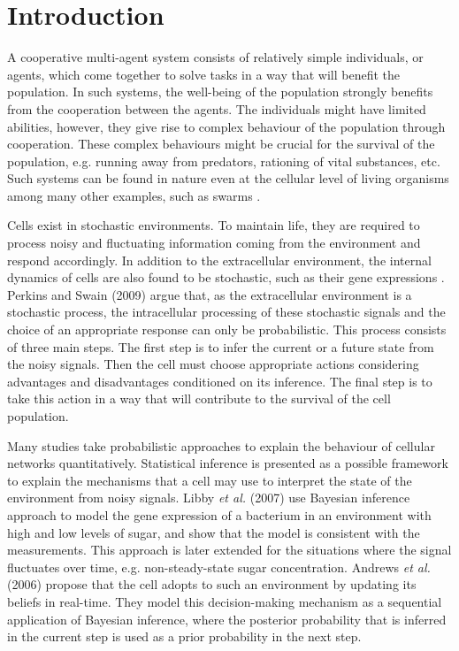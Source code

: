 \chapter{Introduction}
A cooperative multi-agent system consists of relatively simple individuals, or agents, which come together to solve tasks in a way that will benefit the population. In such systems, the well-being of the population strongly benefits from the cooperation between the agents. The individuals might have limited abilities, however, they give rise to complex behaviour of the population through cooperation. These complex behaviours might be crucial for the survival of the population, e.g. running away from predators, rationing of vital substances, etc. Such systems can be found in nature even at the cellular level of living organisms \cite{Perkins2009a} among many other examples, such as swarms \cite{tan2013research}. \par
Cells exist in stochastic environments. To maintain life, they are required to process noisy and fluctuating information coming from the environment and respond accordingly. In addition to the extracellular environment, the internal dynamics of cells are also found to be stochastic, such as their gene expressions \cite{Shahrezaei2008}. Perkins and Swain (2009) \cite{Perkins2009a} argue that, as the extracellular environment is a stochastic process, the intracellular processing of these stochastic signals and the choice of an appropriate response can only be probabilistic. This process consists of three main steps. The first step is to infer the current or a future state from the noisy signals. Then the cell must choose appropriate actions considering advantages and disadvantages conditioned on its inference. The final step is to take this action in a way that will contribute to the survival of the cell population. \par
Many studies take probabilistic approaches to explain the behaviour of cellular networks quantitatively. Statistical inference is presented as a possible framework to explain the mechanisms that a cell may use to interpret the state of the environment from noisy signals. Libby \textit{et al.} (2007) \cite{Libby2007} use Bayesian inference approach to model the gene expression of a bacterium in an environment with high and low levels of sugar, and show that the model is consistent with the measurements. This approach is later extended for the situations where the signal fluctuates over time, e.g. non-steady-state sugar concentration. Andrews \textit{et al.} (2006) \cite{Andrews2006} propose that the cell adopts to such an environment by updating its beliefs in real-time. They model this decision-making mechanism as a sequential application of Bayesian inference, where the posterior probability that is inferred in the current step is used as a prior probability in the next step.\par
